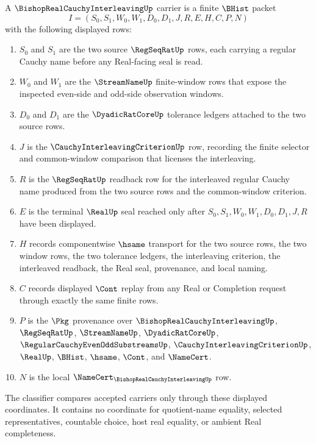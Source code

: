 \begin{definition}
\label{def:bishop-real-cauchy-interleaving-carrier}
A $\BishopRealCauchyInterleavingUp$ carrier is a finite $\BHist$ packet
$$
I=(S_0,S_1,W_0,W_1,D_0,D_1,J,R,E,H,C,P,N)
$$
with the following displayed rows:
\begin{enumerate}
\item $S_0$ and $S_1$ are the two source $\RegSeqRatUp$ rows, each carrying a regular Cauchy name before any Real-facing seal is read.
\item $W_0$ and $W_1$ are the $\StreamNameUp$ finite-window rows that expose the inspected even-side and odd-side observation windows.
\item $D_0$ and $D_1$ are the $\DyadicRatCoreUp$ tolerance ledgers attached to the two source rows.
\item $J$ is the $\CauchyInterleavingCriterionUp$ row, recording the finite selector and common-window comparison that licenses the interleaving.
\item $R$ is the $\RegSeqRatUp$ readback row for the interleaved regular Cauchy name produced from the two source rows and the common-window criterion.
\item $E$ is the terminal $\RealUp$ seal reached only after $S_0,S_1,W_0,W_1,D_0,D_1,J,R$ have been displayed.
\item $H$ records componentwise $\hsame$ transport for the two source rows, the two window rows, the two tolerance ledgers, the interleaving criterion, the interleaved readback, the Real seal, provenance, and local naming.
\item $C$ records displayed $\Cont$ replay from any Real or Completion request through exactly the same finite rows.
\item $P$ is the $\Pkg$ provenance over $\BishopRealCauchyInterleavingUp$, $\RegSeqRatUp$, $\StreamNameUp$, $\DyadicRatCoreUp$, $\RegularCauchyEvenOddSubstreamsUp$, $\CauchyInterleavingCriterionUp$, $\RealUp$, $\BHist$, $\hsame$, $\Cont$, and $\NameCert$.
\item $N$ is the local $\NameCert_{\BishopRealCauchyInterleavingUp}$ row.
\end{enumerate}
The classifier compares accepted carriers only through these displayed coordinates. It contains no coordinate for quotient-name equality, selected representatives, countable choice, host real equality, or ambient Real completeness.
\end{definition}

